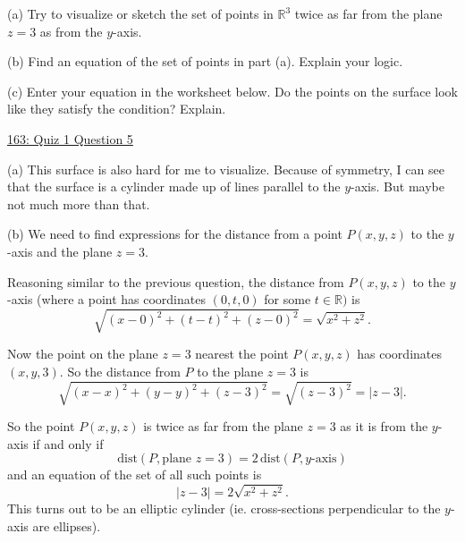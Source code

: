 \documentclass{ximera}
\begin{document}
\begin{question}  \label{Qpdfdsfe032}
(a) Try to visualize or sketch the set of points in $\mathbb{R}^3$  twice as far from the plane $z=3$ as from the $y$-axis. 

(b) Find an equation of the set of points in part (a). Explain your logic.

(c) Enter  your equation in the worksheet below. Do the points on the surface look like they satisfy the condition? Explain.

\begin{onlineOnly}
    \begin{center}
\end{center}
\end{onlineOnly}

\href{https://www.desmos.com/3d/qvin80o05t}{163: Quiz 1 Question 5}


\begin{explanation}
(a) This surface is also hard for me to visualize. Because of symmetry, I can see that the surface is a cylinder made up of lines parallel to the $y$-axis. But maybe not much more than that.

(b) We need to find expressions for the distance from a point $P(x,y,z)$ to the $y$-axis and the plane $z=3$. 

Reasoning similar to the previous question, the distance from $P(x,y,z)$ to the $y$-axis (where a point has coordinates $(0,t,0)$ for some $t\in \mathbb{R})$ is
\[
         \sqrt{(x-0)^2 + (t-t)^2 + (z-0)^2} = \sqrt{x^2 + z^2} .
\] 

Now the point on the plane $z=3$ nearest the point $P(x,y,z)$ has coordinates $(x,y,3)$. So the distance from $P$ to the plane $z=3$ is
\[
   \sqrt{(x-x)^2 + (y-y)^2 + (z-3)^2} = \sqrt{(z-3)^2}  = |  z - 3 |.
\]

So the point $P(x,y,z)$ is twice as far from the plane $z=3$ as it is from the $y$-axis if and only if 
\[
     \text{dist}(P, \text{plane } z= 3) = 2\, \text{dist}(P, y\text{-axis}) 
\]
and an equation of the set of all such points is
\[
         |  z - 3 |    = 2  \sqrt{x^2 + z^2}.
\]
This turns out to be an elliptic cylinder (ie. cross-sections perpendicular to the $y$-axis are ellipses).
\end{explanation}


\end{question}
\end{document}
